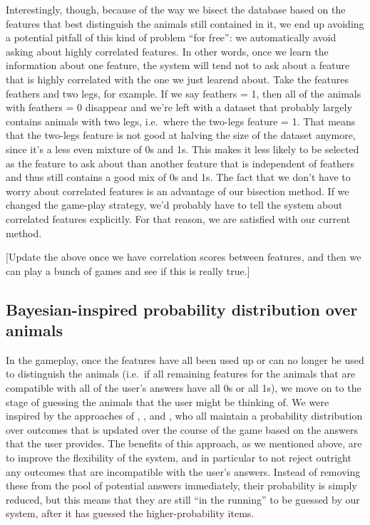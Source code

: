\documentclass[11pt,a4paper]{article}
\begin{document}
Interestingly, though, because of the way we bisect the database based on the features that best distinguish the animals still contained in it, we end up avoiding a potential pitfall of this kind of problem ``for free'': we automatically avoid asking about highly correlated features.
In other words, once we learn the information about one feature, the system will tend not to ask about a feature that is highly correlated with the one we just learend about.
Take the features feathers and two legs, for example.
If we say feathers = 1, then all of the animals with feathers = 0 disappear and we're left with a dataset that probably largely contains animals with two legs, i.e.\ where the two-legs feature = 1. 
That means that the two-legs feature is not good at halving the size of the dataset anymore, since it's a less even mixture of 0s and 1s. 
This makes it less likely to be selected as the feature to ask about than another feature that is independent of feathers and thus still contains a good mix of 0s and 1s.
The fact that we don't have to worry about correlated features is an advantage of our bisection method.
If we changed the game-play strategy, we'd probably have to tell the system about correlated features explicitly.
For that reason, we are satisfied with our current method.

[Update the above once we have correlation scores between features, and then we can play a bunch of games and see if this is really true.]

\subsection{Bayesian-inspired probability distribution over animals}

In the gameplay, once the features have all been used up or can no longer be used to distinguish the animals (i.e.\ if all remaining features for the animals that are compatible with all of the user's answers have all 0s or all 1s), we move on to the stage of guessing the animals that the user might be thinking of.
We were inspired by the approaches of \citet{DeyEa2019}, \citet{HuEa2018}, and \citet{Burgener2006}, who all maintain a probability distribution over outcomes that is updated over the course of the game based on the answers that the user provides.
The benefits of this approach, as we mentioned above, are to improve the flexibility of the system, and in particular to not reject outright any outcomes that are incompatible with the user's answers.
Instead of removing these from the pool of potential answers immediately, their probability is simply reduced, but this means that they are still ``in the running'' to be guessed by our system, after it has guessed the higher-probability items.
\end{document}
